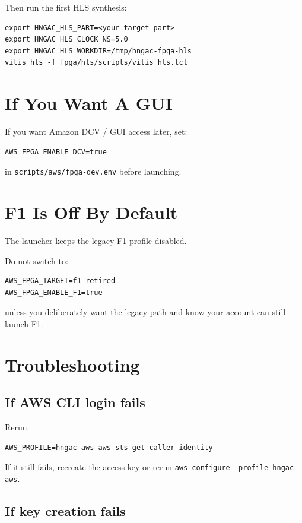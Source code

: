 \documentclass[11pt]{article}
\begin{document}
Then run the first HLS synthesis:

\begin{verbatim}
export HNGAC_HLS_PART=<your-target-part>
export HNGAC_HLS_CLOCK_NS=5.0
export HNGAC_HLS_WORKDIR=/tmp/hngac-fpga-hls
vitis_hls -f fpga/hls/scripts/vitis_hls.tcl
\end{verbatim}

\section*{If You Want A GUI}

If you want Amazon DCV / GUI access later, set:

\begin{verbatim}
AWS_FPGA_ENABLE_DCV=true
\end{verbatim}

in \texttt{scripts/aws/fpga-dev.env} before launching.

\section*{F1 Is Off By Default}

The launcher keeps the legacy F1 profile disabled.

Do not switch to:

\begin{verbatim}
AWS_FPGA_TARGET=f1-retired
AWS_FPGA_ENABLE_F1=true
\end{verbatim}

unless you deliberately want the legacy path and know your account can still launch F1.

\section*{Troubleshooting}

\subsection*{If AWS CLI login fails}

Rerun:

\begin{verbatim}
AWS_PROFILE=hngac-aws aws sts get-caller-identity
\end{verbatim}

If it still fails, recreate the access key or rerun \texttt{aws configure --profile hngac-aws}.

\subsection*{If key creation fails}
\end{document}
